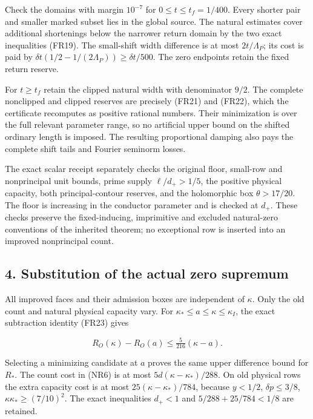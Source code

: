 Check the domains with margin \(10^{-7}\) for \(0\le t\le t_f=1/400\). Every shorter pair and smaller marked subset lies in the global source. The natural estimates cover additional shortenings below the narrower return domain by the two exact inequalities (FR19). The small-shift width difference is at most \(2t/\Lambda_P\); its cost is paid by \(\delta t(1/2-1/(2\Lambda_P))\ge\delta t/500\). The zero endpoints retain the fixed return reserve.

For \(t\ge t_f\) retain the clipped natural width with denominator \(9/2\). The complete nonclipped and clipped reserves are precisely (FR21) and (FR22), which the certificate recomputes as positive rational numbers. Their minimization is over the full relevant parameter range, so no artificial upper bound on the shifted ordinary length is imposed. The resulting proportional damping also pays the complete shift tails and Fourier seminorm losses.

The exact scalar receipt separately checks the original floor, small-row and nonprincipal unit bounds, prime supply \(\ell/d_+>1/5\), the positive physical capacity, both principal-contour reserves, and the holomorphic box \(\theta>17/20\). The floor is increasing in the conductor parameter and is checked at \(d_+\). These checks preserve the fixed-inducing, imprimitive and excluded natural-zero conventions of the inherited theorem; no exceptional row is inserted into an improved nonprincipal count.

\hypertarget{return:substitution-of-the-actual-zero-supremum}{%
\subsection{4. Substitution of the actual zero supremum}\label{return:substitution-of-the-actual-zero-supremum}}

All improved faces and their admission boxes are independent of \(\kappa\). Only the old count and natural physical capacity vary. For \(\kappa_*\le a\le\kappa\le\kappa_I\), the exact subtraction identity (FR23) gives

\[
 R_O(\kappa)-R_O(a)\le\tfrac5{216}(\kappa-a).
\]

Selecting a minimizing candidate at \(a\) proves the same upper difference bound for \(R_*\). The count cost in (NR6) is at most \(5d(\kappa-\kappa_*)/288\). On old physical rows the extra capacity cost is at most \(25(\kappa-\kappa_*)/784\), because \(y<1/2\), \(\delta p\le3/8\), \(\kappa\kappa_*\ge(7/10)^2\). The exact inequalities \(d_+<1\) and \(5/288+25/784<1/8\) are retained.

